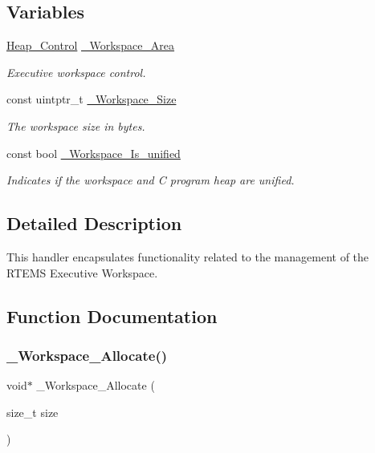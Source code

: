 \subsection*{Variables}
\begin{DoxyCompactItemize}
\item 
\mbox{\hyperlink{structHeap__Control}{Heap\+\_\+\+Control}} \mbox{\hyperlink{group__RTEMSScoreWorkspace_gafe1ea31ce9287b6d4aff796ea3e4072d}{\+\_\+\+Workspace\+\_\+\+Area}}
\begin{DoxyCompactList}\small\item\em Executive workspace control. \end{DoxyCompactList}\item 
const uintptr\+\_\+t \mbox{\hyperlink{group__RTEMSScoreWorkspace_gae5131dff6dba6c4bd266d2da11aacf93}{\+\_\+\+Workspace\+\_\+\+Size}}
\begin{DoxyCompactList}\small\item\em The workspace size in bytes. \end{DoxyCompactList}\item 
const bool \mbox{\hyperlink{group__RTEMSScoreWorkspace_ga84b72a03c4cdbd5239ff69fef4731406}{\+\_\+\+Workspace\+\_\+\+Is\+\_\+unified}}
\begin{DoxyCompactList}\small\item\em Indicates if the workspace and C program heap are unified. \end{DoxyCompactList}\end{DoxyCompactItemize}


\subsection{Detailed Description}
This handler encapsulates functionality related to the management of the R\+T\+E\+MS Executive Workspace. 

\subsection{Function Documentation}
\mbox{\label{group__RTEMSScoreWorkspace_ga8b19b310c0e6194a2750c505367d8539}} 
\subsubsection{\texorpdfstring{\_Workspace\_Allocate()}{\_Workspace\_Allocate()}}
{\footnotesize\ttfamily void$\ast$ \+\_\+\+Workspace\+\_\+\+Allocate (\begin{DoxyParamCaption}\item[{size\+\_\+t}]{size }\end{DoxyParamCaption})}



